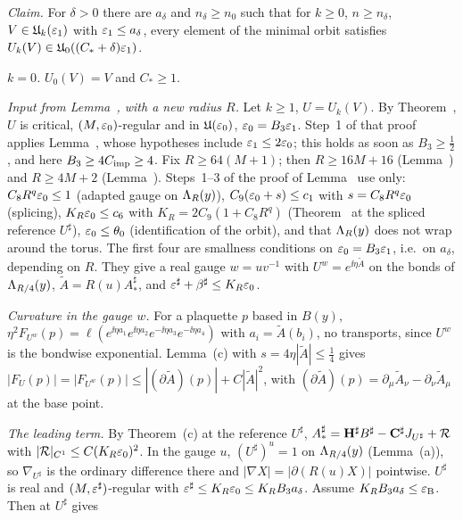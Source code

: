\begin{detail}\label{d7:sharp}
\emph{Claim.} For $\delta>0$ there are $a_\delta$ and $n_\delta\ge n_0$ such that for $k\ge0$, $n\ge n_\delta$, $V\in\mathfrak U_k(\varepsilon_1)$ with $\varepsilon_1\le a_\delta$, every element of the minimal orbit satisfies $U_k(V)\in\mathfrak U_0((C_*+\delta)\varepsilon_1)$.
\begin{step}
\emph{$k=0$.} $U_0(V)=V$ and $C_*\ge1$.
\end{step}
\begin{step}
\emph{Input from Lemma~, with a new radius $R$.} Let $k\ge1$, $U=U_k(V)$. By Theorem~, $U$ is critical, $(M,\varepsilon_0)$-regular and in $\mathfrak U(\varepsilon_0)$, $\varepsilon_0=B_3\varepsilon_1$. Step~1 of that proof applies Lemma~, whose hypotheses include $\varepsilon_1\le2\varepsilon_0$; this holds as soon as $B_3\ge\frac12$, and here $B_3\ge4C_{\rm imp}\ge4$. Fix $R\ge64(M+1)$; then $R\ge16M+16$ (Lemma~) and $R\ge4M+2$ (Lemma~). Steps~1--3 of the proof of Lemma~ use only: $C_8R^q\varepsilon_0\le1$ (adapted gauge on $\Lambda_R(y)$), $C_9(\varepsilon_0+s)\le c_1$ with $s=C_8R^q\varepsilon_0$ (splicing), $K_R\varepsilon_0\le c_6$ with $K_R=2C_9(1+C_8R^q)$ (Theorem~ at the spliced reference $U^\sharp$), $\varepsilon_0\le\theta_0$ (identification of the orbit), and that $\Lambda_R(y)$ does not wrap around the torus. The first four are smallness conditions on $\varepsilon_0=B_3\varepsilon_1$, i.e.\ on $a_\delta$, depending on $R$. They give a real gauge $w=uv^{-1}$ with $U^w=e^{\ii\eta\tilde A}$ on the bonds of $\Lambda_{R/4}(y)$, $\tilde A=R(u)A^\sharp_*$, and $\varepsilon^\sharp+\beta^\sharp\le K_R\varepsilon_0$.
\end{step}
\begin{step}
\emph{Curvature in the gauge $w$.} For a plaquette $p$ based in $B(y)$, $\eta^2F_{U^w}(p)=\ell(e^{\ii\eta a_1}e^{\ii\eta a_2}e^{-\ii\eta a_3}e^{-\ii\eta a_4})$ with $a_i=\tilde A(b_i)$, no transports, since $U^w$ is the bondwise exponential. Lemma~(c) with $s=4\eta|\tilde A|\le\frac14$ gives $|F_U(p)|=|F_{U^w}(p)|\le|(\partial\tilde A)(p)|+C|\tilde A|^2$, with $(\partial\tilde A)(p)=\partial_\mu\tilde A_\nu-\partial_\nu\tilde A_\mu$ at the base point.
\end{step}
\begin{step}
\emph{The leading term.} By Theorem~(c) at the reference $U^\sharp$, $A^\sharp_*=\mathbf H^\sharp B^\sharp-\mathbf C^\sharp J_{U^\sharp}+\mathcal R$ with $|\mathcal R|_{C^1}\le C(K_R\varepsilon_0)^2$. In the gauge $u$, $(U^\sharp)^u=1$ on $\Lambda_{R/4}(y)$ (Lemma~(a)), so $\nabla_{U^\sharp}$ is the ordinary difference there and $|\nabla X|=|\partial(R(u)X)|$ pointwise. $U^\sharp$ is real and $(M,\varepsilon^\sharp)$-regular with $\varepsilon^\sharp\le K_R\varepsilon_0\le K_RB_3a_\delta$. Assume $K_RB_3a_\delta\le\varepsilon_{\rm B}$. Then  at $U^\sharp$ gives

\end{step}
\end{detail}
